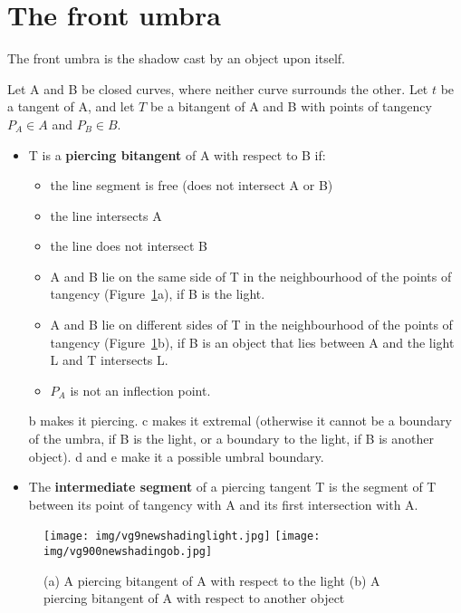 \documentclass[9pt,twocolumn]{article}
\begin{document}

\clearpage

\section{The front umbra}

The front umbra is the shadow cast by an object upon itself.

\begin{defn2}
Let A and B be closed curves, where neither curve surrounds the other.
Let $t$ be a tangent of A,
and let $T$ be a bitangent of A and B with points of tangency $P_A \in A$ and 
$P_B \in B$.

\begin{itemize}
\item T is a {\bf piercing bitangent} of A with respect to B if:
\begin{itemize}
\item the line segment  is free (does not intersect A or B) 
\item the line  intersects A
\item the line  does not intersect B
\item	A and B lie on the same side of T in the neighbourhood of 
	the points of tangency (Figure~\ref{fig:piercing}a),
	if B is the light.
\item   A and B lie on different sides
	of T in the neighbourhood of the points of tangency
	(Figure~\ref{fig:piercing}b),
	if B is an object that lies between A and the light L
	and T intersects L.
\item $P_A$ is not an inflection point.
\end{itemize}
b makes it piercing.
c makes it extremal (otherwise it cannot be a boundary of the umbra, if B is the light, 
or a boundary to the light, if B is another object).
d and e make it a possible umbral boundary.
\item	The {\bf intermediate segment} of a piercing tangent T
	is the segment of T between its point of tangency with A and 
	its first intersection with A.
\end{itemize}
\end{defn2}

\begin{figure}
\begin{center}
\texttt{[image: img/vg9newshadinglight.jpg]}
\texttt{[image: img/vg900newshadingob.jpg]}
\end{center}
\caption{(a) A piercing bitangent of A with respect to the light
	 (b) A piercing bitangent of A with respect to another object}
\label{fig:piercing}
\end{figure}
\end{document}
